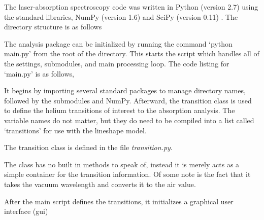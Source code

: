 The laser-absorption spectroscopy code was written in Python (version 2.7) using
the standard libraries, NumPy (version 1.6) and SciPy (version 0.11)
\cite{Jones2001}. The directory structure is as follows

The analysis package can be initialized by running the command `python main.py'
from the root of the directory. This starts the script which handles all of the
settings, submodules, and main processing loop. The code listing for
`main.py' is as follows,



It begins by importing several standard packages to manage directory names,
followed by the submodules and NumPy. Afterward, the transition class is used to
define the helium transitions of interest to the absorption analysis. The
variable names do not matter, but they do need to be compiled into a list called
`transitions' for use with the lineshape model.

The transition class is defined in the file \emph{transition.py}.



The class has no built in methods to speak of, instead it is merely acts as a
simple container for the transition information. Of some note is the fact that
it takes the vacuum wavelength and converts it to the air value.

After the main script defines the transitions, it initializes a graphical user
interface (\acs{gui}) 
